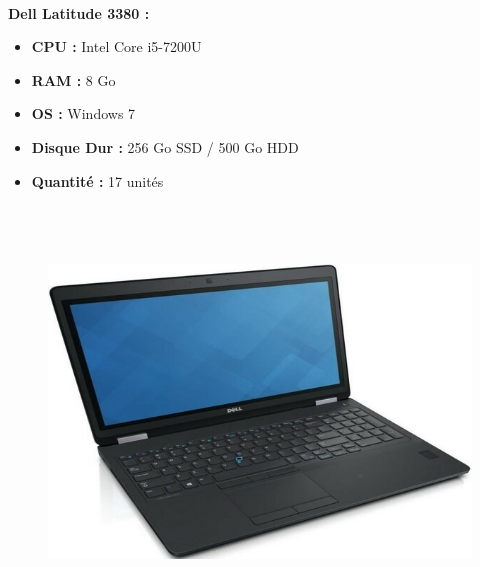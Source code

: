\documentclass[11pt,a4paper,oneside]{article}
\begin{document}
\paragraph{}\textbf{Dell Latitude 3380 :} \\
\begin{itemize}
\item \textbf{CPU :} Intel Core i5-7200U
\item \textbf{RAM :} 8 Go
\item \textbf{OS :} Windows 7
\item \textbf{Disque Dur :} 256 Go SSD / 500 Go HDD
\item \textbf{Quantité :} 17 unités
\\ \\ \\ \\
\end{itemize}
\newpage
\begin{figure}
\includegraphics[scale=0.4]{Ressources/Materiel/LE5570.jpg}\vspace{-2cm}
\end{figure}
\end{document}
